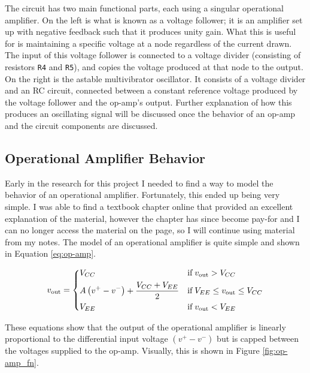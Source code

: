 \documentclass[12pt]{article}
\begin{document}
The circuit has two main functional parts, each using a singular operational amplifier. On the left is what is known as a voltage follower; it is an amplifier set up with negative feedback such that it produces unity gain. What this is useful for is maintaining a specific voltage at a  node regardless of the current drawn. The input of this voltage follower is connected to a voltage divider (consisting of resistors \texttt{R4} and \texttt{R5}), and copies the voltage produced at that node to the output. On the right is the astable multivibrator oscillator. It consists of a voltage divider and an RC circuit, connected between a constant reference voltage produced by the voltage follower and the op-amp’s output. Further explanation of how this produces an oscillating signal will be discussed once the behavior of an op-amp and the circuit components are discussed.

\subsection{Operational Amplifier Behavior}
Early in the research for this project I needed to find a way to model the behavior of an operational amplifier. Fortunately, this ended up being very simple. I was able to find a textbook chapter online \cite{springerEE} that provided an excellent explanation of the material, however the chapter has since become pay-for and I can no longer access the material on the page, so I will continue using material from my notes. The model of an operational amplifier is quite simple and shown in Equation \ref{eq:op-amp}.

\begin{spreadlines}{0.5ex}
\begin{equation} \label{eq:op-amp}
v_\text{out} =
\begin{dcases}
V_{CC} & \text{if}\; v_\text{out} > V_{CC}\\
A\left(v^+ - v^-\right) + \frac{V_{CC} + V_{EE}}{2} & \text{if}\; V_{EE} \leq v_\text{out} \leq V_{CC} \\
V_{EE} & \text{if}\; v_\text{out} < V_{EE}\\ 
\end{dcases}
\end{equation}
\end{spreadlines}

These equations show that the output of the operational amplifier is linearly proportional to the differential input voltage $(v^+ - v^-)$ but is capped between the voltages supplied to the op-amp. Visually, this is shown in Figure \ref{fig:op-amp_fn}.
\end{document}

